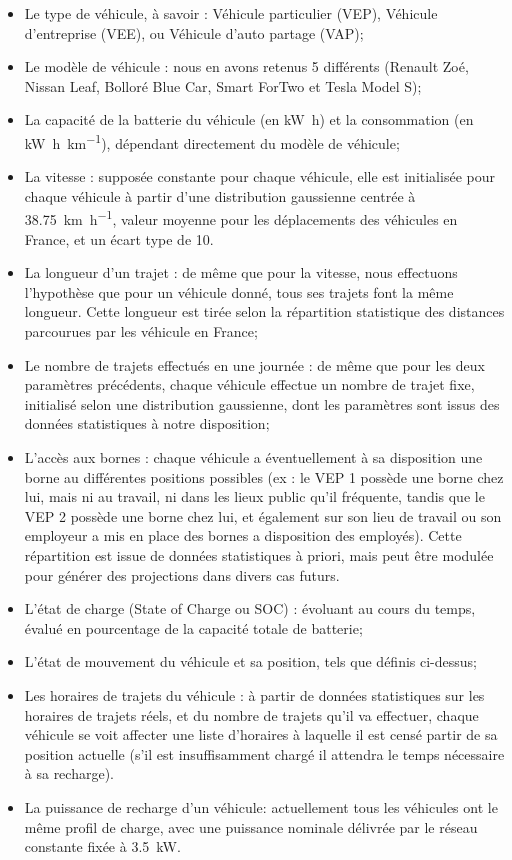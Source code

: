		\begin{itemize}
			\item Le type de véhicule, à savoir : Véhicule particulier (VEP), Véhicule d'entreprise (VEE), ou Véhicule d'auto partage (VAP);
			\item Le modèle de véhicule : nous en avons retenus 5 différents (Renault Zoé, Nissan Leaf, Bolloré Blue Car, Smart ForTwo et Tesla Model S);
			\item La capacité de la batterie du véhicule (en \si{\kilo\watt\hour}) et la consommation (en \si{\kilo\watt\hour\per\kilo\meter}), dépendant directement du modèle de véhicule;
			\item La vitesse : supposée constante pour chaque véhicule, elle est initialisée pour chaque véhicule à partir d'une distribution gaussienne centrée à \SI{38,75}{\kilo\meter\per\hour}, valeur moyenne pour les déplacements des véhicules en France, et un écart type de 10.
			\item La longueur d'un trajet : de même que pour la vitesse, nous effectuons l'hypothèse que pour un véhicule donné, tous ses trajets font la même longueur. Cette longueur est tirée selon la répartition statistique des distances parcourues par les véhicule en France;
			\item Le nombre de trajets effectués en une journée : de même que pour les deux paramètres précédents, chaque véhicule effectue un nombre de trajet fixe, initialisé selon une distribution gaussienne, dont les paramètres sont issus des données statistiques à notre disposition;
			\item L'accès aux bornes : chaque véhicule a éventuellement à sa disposition une borne au différentes positions possibles (ex : le VEP \no{}1 possède une borne chez lui, mais ni au travail, ni dans les lieux public qu'il fréquente, tandis que le VEP \no{}2 possède une borne chez lui, et également sur son lieu de travail ou son employeur a mis en place des bornes a disposition des employés). Cette répartition est issue de données statistiques à priori, mais peut être modulée pour générer des projections dans divers cas futurs.  
			\item L'état de charge (State of Charge ou SOC) : évoluant au cours du temps, évalué en pourcentage de la capacité totale de batterie;
			\item L'état de mouvement du véhicule et sa position, tels que définis ci-dessus;
			\item Les horaires de trajets du véhicule : à partir de données statistiques sur les horaires de trajets réels, et du nombre de trajets qu'il va effectuer, chaque véhicule se voit affecter une liste d'horaires à laquelle il est censé partir de sa position actuelle (s'il est insuffisamment chargé il attendra le temps nécessaire à sa recharge).
			\item La puissance de recharge d'un véhicule: actuellement tous les véhicules ont le même profil de charge, avec une puissance nominale délivrée par le réseau constante fixée à \SI{3,5}{\kilo\watt}.
		\end{itemize}
		
